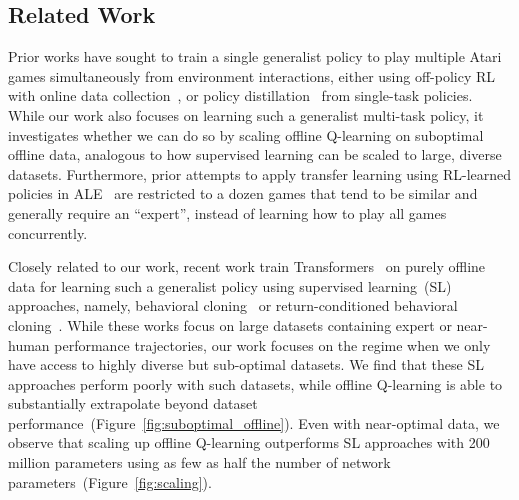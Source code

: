 \vspace{-0.2cm}
\subsection{Related Work}
\vspace{-0.2cm}

Prior works have sought to train a single generalist policy to play multiple Atari games simultaneously from environment interactions, either using off-policy RL with online data collection~\citep{espeholt2018impala, hessel2019multi, song2019v}, or policy distillation~\citep{teh2017distral, rusu2015policy} from single-task policies. While our work also focuses on learning such a generalist multi-task policy, it investigates whether we can do so by scaling offline Q-learning on suboptimal offline data, analogous to how supervised learning can be scaled to large, diverse datasets. Furthermore, prior attempts to apply transfer learning using RL-learned policies in ALE~\citep{rusu2015policy, parisotto2015actor, mittel2019visual} are restricted to a dozen games that tend to be similar and generally require an “expert”, instead of learning how to play all games concurrently. 

Closely related to our work, recent work train Transformers~\citep{vaswani2017attention} on purely offline data for learning such a generalist policy using supervised learning~(SL) approaches, namely, behavioral cloning~\citep{reed2022generalist} or return-conditioned behavioral cloning~\citep{lee2022multi}. While these works focus on large datasets containing expert or near-human performance trajectories, our work focuses on the regime when we only have access to highly diverse but sub-optimal datasets. We find that these SL approaches perform poorly with such datasets, while offline Q-learning is able to substantially extrapolate beyond dataset performance~(Figure~\ref{fig:suboptimal_offline}). Even with near-optimal data, we observe that scaling up offline Q-learning outperforms  SL approaches with 200 million parameters using as few as half the number of network parameters~(Figure~\ref{fig:scaling}).


